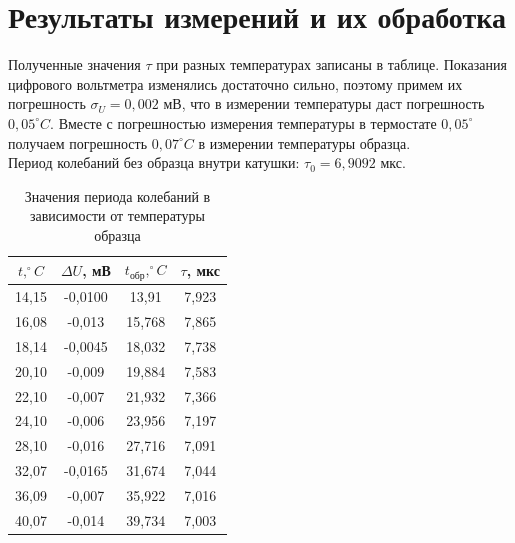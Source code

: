 \documentclass[a4paper, 12pt]{article}
\begin{document}
	\section* {Результаты измерений и их обработка}
	Полученные значения $\tau$ при разных температурах записаны в таблице. Показания цифрового вольтметра изменялись достаточно сильно, поэтому примем их погрешность $\sigma_U = 0,002$ мВ, что в измерении температуры даст погрешность $0,05^{\circ} C$. Вместе с погрешностью измерения температуры в термостате $0,05^{\circ}$ получаем погрешность $0,07^{\circ} C$ в измерении температуры образца.\\
	Период колебаний без образца внутри катушки: $\tau_0 = 6,9092$ мкс.
	\begin{table}[h!]
		\centering
		\begin{tabular}{|c|c|c|c|}
			\hline
			$t, ^{\circ}C$ & $\Delta U$, мВ & $t_{\text{обр}}, ^{\circ} C$ & $\tau$, мкс \\ \hline
			14,15 & -0,0100 & 13,91 & 7,923 \\ \hline
			16,08 & -0,013 & 15,768 & 7,865 \\ \hline
			18,14 & -0,0045 & 18,032 & 7,738 \\ \hline
			20,10 & -0,009 & 19,884 & 7,583 \\ \hline
			22,10 & -0,007 & 21,932 & 7,366 \\ \hline
			24,10 & -0,006 & 23,956 & 7,197 \\ \hline
			28,10 & -0,016 & 27,716 & 7,091 \\ \hline
			32,07 & -0,0165 & 31,674 & 7,044 \\ \hline
			36,09 & -0,007 & 35,922 & 7,016 \\ \hline
			40,07 & -0,014 & 39,734 & 7,003 \\ \hline
		\end{tabular}
		\caption{Значения периода колебаний в зависимости от температуры образца}
	\end{table}
\end{document}
